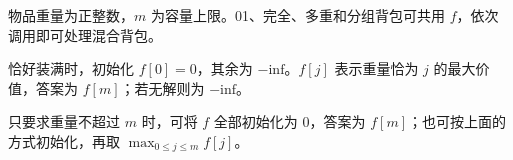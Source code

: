物品重量为正整数，$m$ 为容量上限。01、完全、多重和分组背包可共用 $f$，依次调用即可处理混合背包。

恰好装满时，初始化 $f[0]=0$，其余为 $-\mathrm{inf}$。$f[j]$ 表示重量恰为 $j$ 的最大价值，答案为 $f[m]$；若无解则为 $-\mathrm{inf}$。

只要求重量不超过 $m$ 时，可将 $f$ 全部初始化为 $0$，答案为 $f[m]$；也可按上面的方式初始化，再取 $\max_{0\le j\le m}f[j]$。

